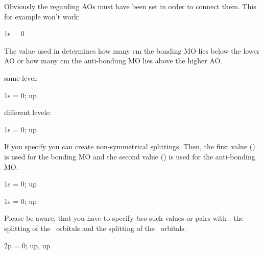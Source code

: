 \documentclass[load-preamble+]{cnltx-doc}
\begin{document}
Obviously the regarding \acp{AO} must have been set in order to connect them.
This for example won't work:
\begin{sourcecode}
  \begin{modiagram} 
     { 1s = 0 }
  \end{modiagram}
\end{sourcecode}
The value used in  determines how many \si{\centi\metre} the
bonding \ac{MO} lies below the lower \ac{AO} or how many \si{\centi\metre} the
anti-bondung \ac{MO} lies above the higher \ac{AO}.

\begin{example}
  same level:\par
  \begin{modiagram}
     { 1s = {  0; up } }
  \end{modiagram}

  different levels:\par
  \begin{modiagram}
     { 1s = {  0; up } }
  \end{modiagram}
\end{example}

If you specify  you can create non-symmetrical splittings.
Then, the first value () is used for the bonding \ac{MO} and
the second value () is used for the anti-bonding \ac{MO}.
\begin{example}
  \begin{modiagram}
     { 1s = {  0; up } }
  \end{modiagram}

  \begin{modiagram}
     { 1s = {  0; up } }
  \end{modiagram}
\end{example}

Please be aware, that you have to specify \emph{two} such values or pairs with
: the splitting of the \chemsigma\ orbitals and the splitting of
the \chempi\ orbitals.
\begin{example}
  \begin{modiagram}
     { 2p = { 0; up, up } }
  \end{modiagram}
\end{example}
\end{document}

